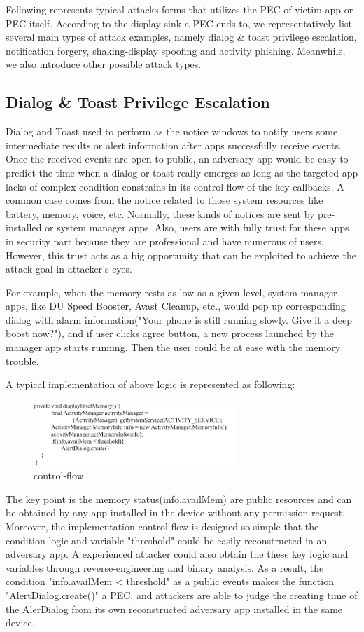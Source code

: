 \documentclass{sig-alternate-05-2015}
\begin{document}
Following represents typical attacks forms that utilizes the PEC of victim app or PEC itself. According to the display-sink a PEC ends to, we representatively list several main types of attack examples, namely dialog \& toast privilege escalation, notification forgery, shaking-display spoofing and activity phishing. Meanwhile, we also introduce other possible attack types.
\subsection{Dialog \& Toast Privilege Escalation}
Dialog and Toast used to perform as the notice windows to notify users some intermediate results or alert information  after apps successfully receive events. Once the received events are open to public, an adversary app would be easy to predict the time when a dialog or toast really emerges as long as the targeted app lacks of complex condition constrains in its control flow of the key callbacks. A common case comes from the notice related to those system resources like battery, memory, voice, etc. Normally, these kinds of notices are sent by pre-installed or system manager apps. Also, users are with fully trust for these apps in security part because they are professional and have numerous of users. However, this trust acts as a big opportunity that can be exploited to achieve the attack goal in attacker's eyes.

For example, when the memory rests as low as a given level, system manager apps, like DU Speed Booster, Avast Cleanup, etc., would pop up corresponding dialog with alarm information("Your phone is still running slowly. Give it a deep boost now?"), and if user clicks agree button, a new process launched by the manager app starts running. Then the user could be at ease with the memory trouble.

A typical implementation of above logic is represented as following:
\begin{figure}
\centering
\includegraphics[width = 3.0in]{code1.png}
\caption{\label{}control-flow}
\end{figure}

The key point is the memory status(info.availMem) are public resources and can be obtained by any app installed in the device without any permission request. Moreover, the implementation control flow is designed so simple that 
the condition logic and variable "threshold" could be easily reconstructed in an adversary app. A experienced attacker could also obtain the these key logic and variables through reverse-engineering and binary analysis. As a result, the condition "info.availMem < threshold" as a public events makes the function "AlertDialog.create()" a PEC, and attackers are able to judge the creating time of the AlerDialog from its own reconstructed adversary app installed in the same device.
\end{document}
